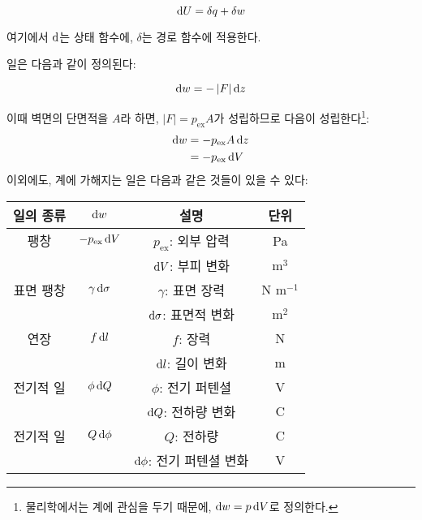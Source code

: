             \begin{law}
                \begin{equation*}
                    \operatorname{d\!} U = \delta q + \delta w
                \end{equation*}
            \end{law}
            여기에서 $\operatorname{d\!}\, $는 상태 함수에, $\delta$는 경로 함수에 적용한다.
            \par 일은 다음과 같이 정의된다:
            \begin{defn}[일]
                \begin{equation*}
                    \operatorname{d\!} w = - \left\vert F \right\vert \operatorname{d\!} z
                \end{equation*}
            \end{defn}
            이때 벽면의 단면적을 $A$라 하면, $\left\vert F \right\vert = p_{\mathrm{ex}}A$가 성립하므로 다음이 성립한다\footnote[6]{%
            물리학에서는 계에 관심을 두기 때문에, $\operatorname{d\!} w = p \operatorname{d\!} V$로 정의한다.
            }:
                \begin{align*}
                        \operatorname{d\!} w &= - p_{\mathrm{ex}}A \operatorname{d\!} z\\
                        &= -p_{\mathrm{ex}} \operatorname{d\!} V
                \end{align*}
            이외에도, 계에 가해지는 일은 다음과 같은 것들이 있을 수 있다:
                \begin{table}[H]
                \centering
                    \begin{tabular}{ c c c c }
                        \hline
                        \rowcolor{lightgray}
                        일의 종류 & $\operatorname{d\!} w$ & 설명 & 단위 \\
                        \hline
                        팽창 & $-p_{\mathrm{ex}}\operatorname{d\!} V$ & $p_{\mathrm{ex}}$: 외부 압력 & Pa\\
                        & & $\operatorname{d\!} V$: 부피 변화 & m$^3$ \\
                        \hline
                        표면 팽창 & $\gamma \operatorname{d\!} \sigma$ & $\gamma$: 표면 장력 & N m$^{-1}$\\
                        & & $\operatorname{d\!} \sigma$: 표면적 변화 & m$^2$\\
                        \hline
                        연장 & $f\operatorname{d\!} l$ & $f$: 장력 & N\\
                        & & $\operatorname{d\!} l$: 길이 변화& m\\
                        \hline
                        전기적 일 & $\phi \operatorname{d\!} Q$ &$\phi$: 전기 퍼텐셜&V\\
                        & & $\operatorname{d\!} Q$: 전하량 변화&C\\
                        \hline
                        전기적 일 & $Q \operatorname{d\!} \phi$ &$Q$: 전하량&C\\
                        & &$\operatorname{d\!} \phi$: 전기 퍼텐셜 변화&V\\
                        \hline
                    \end{tabular}
                \end{table}
